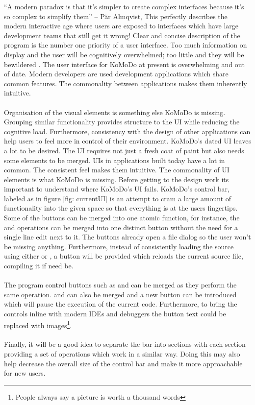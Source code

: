 \graphicspath{ {images/design/} }
``A modern paradox is that it's simpler to create complex interfaces because it's so complex to simplify them'' – P{\"a}r Almqvist, This perfectly describes the modern interactive age where users are exposed to interfaces which have large development teams that still get it wrong! Clear and concise description of the program is the number one priority of a user interface. Too much information on display and the user will be cognitively overwhelmed; too little and they will be bewildered \cite{design_principles}. The user interface for KoMoDo at present is overwhelming and out of date. Modern developers are used development applications which share common features. The commonality between applications makes them inherently intuitive.\\\\
%
Organisation of the visual elements is something else KoMoDo is missing. Grouping similar functionality provides structure to the UI while reducing the cognitive load. Furthermore, consistency with the design of other applications can help users to feel more in control of their environment\cite{design_principles_two}.
KoMoDo's dated UI leaves a lot to be desired. The UI requires not just a fresh coat of paint but also needs some elements to be merged. UIs in applications built today have a lot in common. The consistent feel makes them intuitive. The commonality of UI elements is what KoMoDo is missing. Before getting to the design work its important to understand where KoMoDo's UI fails.
%
KoMoDo's control bar, labeled as  in figure \ref{fig: currentUI} is an attempt to cram a large amount of functionality into the given space so that everything is at the users fingertips. Some of the buttons can be merged into one atomic function, for instance, the  and  operations can be merged into one distinct button without the need for a single line edit next to it. The buttons already open a file dialog so the user won't be missing anything. Furthermore, instead of consistently loading the source using either  or , a  button will be provided which reloads the current source file, compiling it if need be.\\\\
%
The program control buttons such as  and  can be merged as they perform the same operation.  and  can also be merged and a new button  can be introduced which will pause the execution of the current code. Furthermore, to bring the controls inline with modern IDEs and debuggers the button text could be replaced with images\footnote{People always say a picture is worth a thousand words}.\\\\
%
Finally, it will be a good idea to separate the bar into sections with each section providing a set of operations which work in a similar way. Doing this may also help decrease the overall size of the control bar and make it more approachable for new users.

